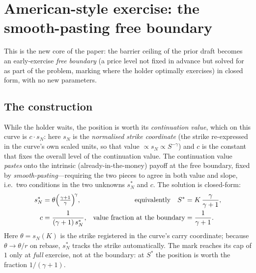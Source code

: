 \documentclass[runningheads]{llncs}
\begin{document}
\section{American-style exercise: the smooth-pasting free boundary}
\label{sec:american}

This is the new core of the paper: the barrier ceiling of the prior draft becomes
an early-exercise \emph{free boundary} (a price level not fixed in advance but
solved for as part of the problem, marking where the holder optimally exercises)
in closed form, with no new parameters.

\subsection{The construction}
While the holder waits, the position is worth its \emph{continuation value}, which
on this curve is $c\cdot s_{N}$: here $s_{N}$ is the \emph{normalised strike
coordinate} (the strike re-expressed in the curve's own scaled units, so that value
$\propto s_{N}\propto S^{-\gamma}$) and $c$ is the constant that fixes the overall
level of the continuation value. The continuation value \emph{pastes} onto the
intrinsic (already-in-the-money) payoff at the free boundary, fixed by
\emph{smooth-pasting}---requiring the two pieces to agree in both value and slope,
i.e.\ two conditions in the two unknowns $s_{N}^{\ast}$ and $c$. The solution is
closed-form:
\begin{align}
  s_{N}^{\ast} &= \theta\Bigl(\tfrac{\gamma+1}{\gamma}\Bigr)^{\!\gamma},
  & \text{equivalently}\quad
  S^{\ast} &= K\,\frac{\gamma}{\gamma+1},
  \label{eq:boundary}\\
  c &= \frac{1}{(\gamma+1)\,s_{N}^{\ast}},
  & \text{value fraction at the boundary} &= \frac{1}{\gamma+1}.
  \label{eq:coeff}
\end{align}
Here $\theta=s_{N}(K)$ is the strike registered in the curve's carry coordinate;
because $\theta\to\theta/r$ on rebase, $s_{N}^{\ast}$ tracks the strike
automatically. The mark reaches its cap of $1$ only at \emph{full} exercise, not
at the boundary: at $S^{\ast}$ the position is worth the fraction $1/(\gamma+1)$.
\end{document}

